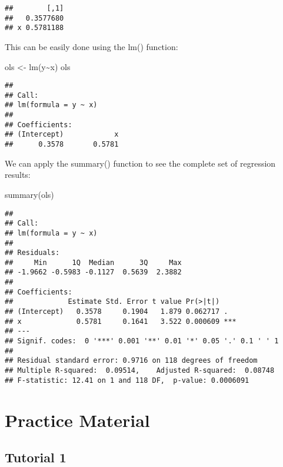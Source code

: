 \documentclass[
  oneside]{book}
\newenvironment{Shaded}{\begin{snugshade}}{\end{snugshade}}
\newcommand{\FunctionTok}[1]{\textcolor[rgb]{0.00,0.00,0.00}{#1}}
\newcommand{\NormalTok}[1]{#1}
\newcommand{\OtherTok}[1]{\textcolor[rgb]{0.56,0.35,0.01}{#1}}
\newcommand{\SpecialCharTok}[1]{\textcolor[rgb]{0.00,0.00,0.00}{#1}}
\begin{document}
\begin{verbatim}
##        [,1]
##   0.3577680
## x 0.5781188
\end{verbatim}

This can be easily done using the lm() function:

\begin{Shaded}
\begin{Highlighting}[]
\NormalTok{ols }\OtherTok{\textless{}{-}} \FunctionTok{lm}\NormalTok{(y}\SpecialCharTok{\textasciitilde{}}\NormalTok{x)}
\NormalTok{ols}
\end{Highlighting}
\end{Shaded}

\begin{verbatim}
## 
## Call:
## lm(formula = y ~ x)
## 
## Coefficients:
## (Intercept)            x  
##      0.3578       0.5781
\end{verbatim}

We can apply the summary() function to see the complete set of regression results:

\begin{Shaded}
\begin{Highlighting}[]
\FunctionTok{summary}\NormalTok{(ols)}
\end{Highlighting}
\end{Shaded}

\begin{verbatim}
## 
## Call:
## lm(formula = y ~ x)
## 
## Residuals:
##     Min      1Q  Median      3Q     Max 
## -1.9662 -0.5983 -0.1127  0.5639  2.3882 
## 
## Coefficients:
##             Estimate Std. Error t value Pr(>|t|)    
## (Intercept)   0.3578     0.1904   1.879 0.062717 .  
## x             0.5781     0.1641   3.522 0.000609 ***
## ---
## Signif. codes:  0 '***' 0.001 '**' 0.01 '*' 0.05 '.' 0.1 ' ' 1
## 
## Residual standard error: 0.9716 on 118 degrees of freedom
## Multiple R-squared:  0.09514,    Adjusted R-squared:  0.08748 
## F-statistic: 12.41 on 1 and 118 DF,  p-value: 0.0006091
\end{verbatim}

\hypertarget{practice-material}{%
\chapter*{Practice Material}\label{practice-material}}

\hypertarget{tutorial-1}{%
\section*{Tutorial 1}\label{tutorial-1}}
\end{document}
